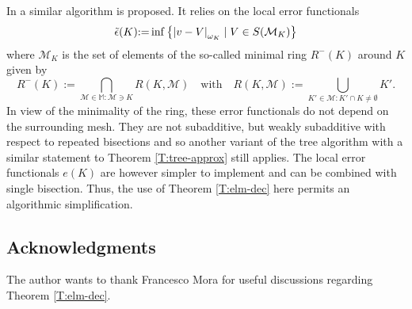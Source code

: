 \documentclass[a4paper]{amsart}
\numberwithin{equation}{section}
\theoremstyle{plain}
\theoremstyle{definition}
\begin{document}
In \cite[\S7]{Binev.DeVore:04} a similar algorithm is proposed.  It relies on 
the local error functionals
\[
 \Tilde{\epsilon}({K})
 {:=}
 \inf\big\{
  {\left|{v-V}\right|_{{\omega_{K}}}} \mid V\in{S}({\mathcal{M}}_{K})
  \big\}
\]
where ${\mathcal{M}}_{K}$ is the set of elements of the so-called minimal ring 
$R^-({K})$ around ${K}$ given by
\[
 R^-({K})
 {:=}
 \bigcap_{{\mathcal{M}}\in{\mathbb{M}}:{\mathcal{M}}\ni{K}} R({K},{\mathcal{M}})
\quad\text{with}\quad
 R({K},{\mathcal{M}})
 {:=}
 \bigcup_{{K}'\in{\mathcal{M}}:{K}'\cap{K}\neq\emptyset} {K}'.
\]
In view of the minimality of the ring, these error functionals do not depend on 
the surrounding mesh.  They are not subadditive, but weakly subadditive with 
respect to repeated bisections and so another variant of the tree algorithm 
with a similar statement to Theorem \ref{T:tree-approx} still applies.  The 
local error functionals $e({K})$ are however simpler to implement and can be 
combined with single bisection.  Thus, the use of Theorem \ref{T:elm-dec} here 
permits an algorithmic simplification. 
 

\subsection*{Acknowledgments}
The author wants to thank Francesco Mora for useful discussions regarding 
Theorem \ref{T:elm-dec}.
\end{document}
